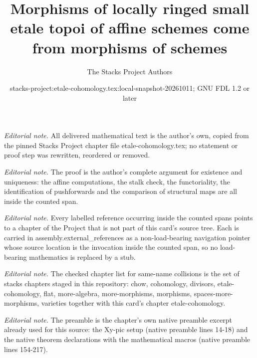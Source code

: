 \documentclass[10pt,a4paper]{amsart}
\title{Morphisms of locally ringed small etale topoi of affine schemes come from morphisms of schemes}
\author{The Stacks Project Authors}
\date{stacks-project:etale-cohomology.tex:local-snapshot-20261011; GNU FDL 1.2 or later}
\theoremstyle{plain}
\theoremstyle{definition}
\theoremstyle{remark}
\numberwithin{equation}{subsection}
\begin{document}
\maketitle
\noindent\textit{Editorial note.} All delivered mathematical text is the author's own, copied from the pinned Stacks Project chapter file etale-cohomology.tex; no statement or proof step was rewritten, reordered or removed.\par\medskip
\noindent\textit{Editorial note.} The proof is the author's complete argument for existence and uniqueness: the affine computations, the stalk check, the functoriality, the identification of pushforwards and the comparison of structural maps are all inside the counted span.\par\medskip
\noindent\textit{Editorial note.} Every labelled reference occurring inside the counted spans points to a chapter of the Project that is not part of this card's source tree. Each is carried in assembly.external\_references as a non-load-bearing navigation pointer whose source location is the invocation inside the counted span, so no load-bearing mathematics is replaced by a stub.\par\medskip
\noindent\textit{Editorial note.} The checked chapter list for same-name collisions is the set of stacks chapters staged in this repository: chow, cohomology, divisors, etale-cohomology, flat, more-algebra, more-morphisms, morphisms, spaces-more-morphisms, varieties together with this card's chapter etale-cohomology.\par\medskip
\noindent\textit{Editorial note.} The preamble is the chapter's own native preamble excerpt already used for this source: the Xy-pic setup (native preamble lines 14-18) and the native theorem declarations with the mathematical macros (native preamble lines 154-217).\par\medskip
\end{document}
